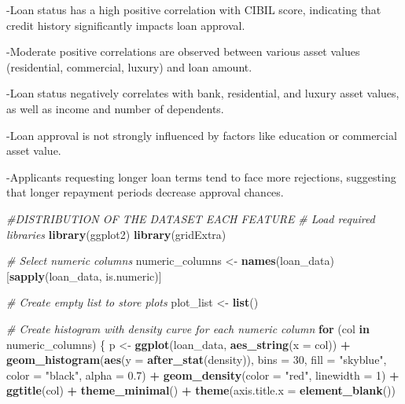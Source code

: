 \documentclass[
]{article}
\newenvironment{Shaded}{\begin{snugshade}}{\end{snugshade}}
\newcommand{\AttributeTok}[1]{\textcolor[rgb]{0.13,0.29,0.53}{#1}}
\newcommand{\CommentTok}[1]{\textcolor[rgb]{0.56,0.35,0.01}{\textit{#1}}}
\newcommand{\ControlFlowTok}[1]{\textcolor[rgb]{0.13,0.29,0.53}{\textbf{#1}}}
\newcommand{\DecValTok}[1]{\textcolor[rgb]{0.00,0.00,0.81}{#1}}
\newcommand{\FloatTok}[1]{\textcolor[rgb]{0.00,0.00,0.81}{#1}}
\newcommand{\FunctionTok}[1]{\textcolor[rgb]{0.13,0.29,0.53}{\textbf{#1}}}
\newcommand{\NormalTok}[1]{#1}
\newcommand{\OtherTok}[1]{\textcolor[rgb]{0.56,0.35,0.01}{#1}}
\newcommand{\SpecialCharTok}[1]{\textcolor[rgb]{0.81,0.36,0.00}{\textbf{#1}}}
\newcommand{\StringTok}[1]{\textcolor[rgb]{0.31,0.60,0.02}{#1}}
\begin{document}
-Loan status has a high positive correlation with CIBIL score,
indicating that credit history significantly impacts loan approval.

-Moderate positive correlations are observed between various asset
values (residential, commercial, luxury) and loan amount.

-Loan status negatively correlates with bank, residential, and luxury
asset values, as well as income and number of dependents.

-Loan approval is not strongly influenced by factors like education or
commercial asset value.

-Applicants requesting longer loan terms tend to face more rejections,
suggesting that longer repayment periods decrease approval chances.

\begin{Shaded}
\begin{Highlighting}[]
\CommentTok{\#DISTRIBUTION OF THE DATASET EACH FEATURE}
\CommentTok{\# Load required libraries}
\FunctionTok{library}\NormalTok{(ggplot2)}
\FunctionTok{library}\NormalTok{(gridExtra)}




\CommentTok{\# Select numeric columns}
\NormalTok{numeric\_columns }\OtherTok{\textless{}{-}} \FunctionTok{names}\NormalTok{(loan\_data)[}\FunctionTok{sapply}\NormalTok{(loan\_data, is.numeric)]}

\CommentTok{\# Create empty list to store plots}
\NormalTok{plot\_list }\OtherTok{\textless{}{-}} \FunctionTok{list}\NormalTok{()}

\CommentTok{\# Create histogram with density curve for each numeric column}
\ControlFlowTok{for}\NormalTok{ (col }\ControlFlowTok{in}\NormalTok{ numeric\_columns) \{}
\NormalTok{  p }\OtherTok{\textless{}{-}} \FunctionTok{ggplot}\NormalTok{(loan\_data, }\FunctionTok{aes\_string}\NormalTok{(}\AttributeTok{x =}\NormalTok{ col)) }\SpecialCharTok{+}
    \FunctionTok{geom\_histogram}\NormalTok{(}\FunctionTok{aes}\NormalTok{(}\AttributeTok{y =} \FunctionTok{after\_stat}\NormalTok{(density)), }
                   \AttributeTok{bins =} \DecValTok{30}\NormalTok{, }
                   \AttributeTok{fill =} \StringTok{"skyblue"}\NormalTok{, }
                   \AttributeTok{color =} \StringTok{"black"}\NormalTok{, }
                   \AttributeTok{alpha =} \FloatTok{0.7}\NormalTok{) }\SpecialCharTok{+}
    \FunctionTok{geom\_density}\NormalTok{(}\AttributeTok{color =} \StringTok{"red"}\NormalTok{, }\AttributeTok{linewidth =} \DecValTok{1}\NormalTok{) }\SpecialCharTok{+}
    \FunctionTok{ggtitle}\NormalTok{(col) }\SpecialCharTok{+}
    \FunctionTok{theme\_minimal}\NormalTok{() }\SpecialCharTok{+}
    \FunctionTok{theme}\NormalTok{(}\AttributeTok{axis.title.x =} \FunctionTok{element\_blank}\NormalTok{())}
  

\end{Highlighting}
\end{Shaded}
\end{document}
